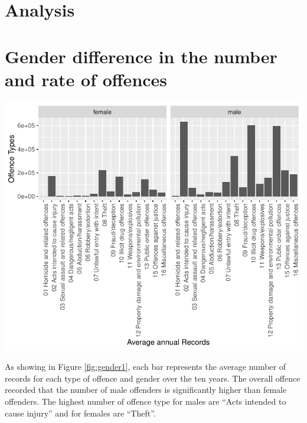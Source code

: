 \documentclass[11pt,a4paper,]{article}
\let\origfigure\figure
\let\endorigfigure\endfigure
\renewenvironment{figure}[1][2] {
\expandafter\origfigure\expandafter[H]
} {
\endorigfigure
}
\begin{document}
\newpage

\hypertarget{analysis}{%
\section{Analysis}\label{analysis}}

\section*{Gender difference in the number and rate of offences}

\begin{figure}
\centering
\includegraphics{ETC5513-Assignment4_files/figure-latex/gender1-1.pdf}
\caption{\label{fig:gender1}Yearly average offence records of different offence type}
\end{figure}

As showing in Figure \ref{fig:gender1}, each bar represents the average number of records for each type of offence and gender over the ten years. The overall offence recorded that the number of male offenders is significantly higher than female offenders. The highest number of offence type for males are ``Acts intended to cause injury'' and for females are ``Theft''.
\end{document}

